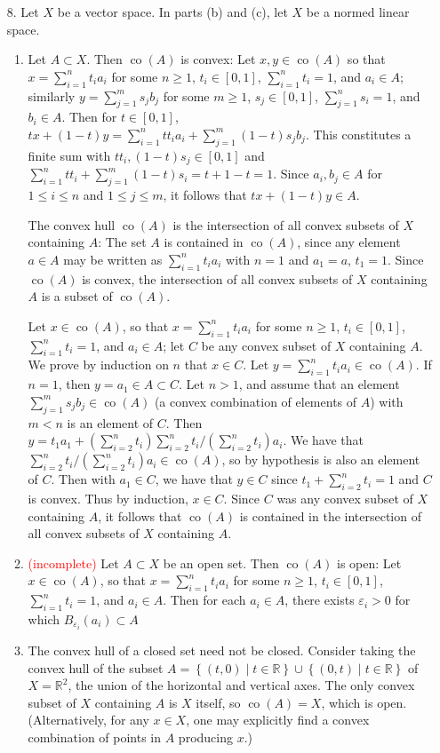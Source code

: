 \documentclass[11pt,leqno]{article}
\theoremstyle{plain}
\theoremstyle{definition}
\numberwithin{equation}{section}
\numberwithin{lem}{section}
\newcommand{\cbr}[1]{\left\{#1\right\}}
\DeclareMathOperator{\co}{co}
\begin{document}
\begin{enumerate}
  \item[8.] Let $X$ be a vector space. In parts (b) and (c), let $X$ be a normed linear space.
  \begin{enumerate}
    \item Let $A\subset X$. Then $\co(A)$ is convex: Let $x,y\in \co(A)$ so that $x = \sum_{i=1}^n t_ia_i$ for some $n\geq 1$, $t_i\in [0,1]$, $\sum_{i=1}^n t_i = 1$, and $a_i\in A$; similarly $y = \sum_{j=1}^m s_jb_j$ for some $m\geq 1$, $s_j\in [0,1]$, $\sum_{j=1}^n s_i = 1$, and $b_i\in A$. Then for $t\in [0,1]$, $tx + (1-t)y = \sum_{i=1}^n tt_ia_i + \sum_{j=1}^m (1-t)s_jb_j$. This constitutes a finite sum with $tt_i,(1-t)s_j\in [0,1]$ and $\sum_{i=1}^n tt_i + \sum_{j=1}^m (1-t)s_i = t + 1-t =1$. Since $a_i,b_j\in A$ for $1\leq i\leq n$ and $1\leq j\leq m$, it follows that $tx + (1-t)y\in A$.
    
    The convex hull $\co(A)$ is the intersection of all convex subsets of $X$ containing $A$: The set $A$ is contained in $\co(A)$, since any element $a\in A$ may be written as $\sum_{i=1}^n t_ia_i$ with $n = 1$ and $a_1 = a$, $t_1 = 1$. Since $\co(A)$ is convex, the intersection of all convex subsets of $X$ containing $A$ is a subset of $\co(A)$.
    
    Let $x\in \co(A)$, so that $x = \sum_{i=1}^n t_ia_i$ for some $n\geq 1$, $t_i\in [0,1]$, $\sum_{i=1}^n t_i = 1$, and $a_i\in A$; let $C$ be any convex subset of $X$ containing $A$. We prove by induction on $n$ that $x\in C$. Let $y = \sum_{i=1}^n t_ia_i \in \co(A)$. If $n = 1$, then $y = a_1\in A\subset C$. Let $n>1$, and assume that an element $\sum_{j=1}^ms_jb_j\in \co(A)$ (a convex combination of elements of $A$) with $m<n$ is an element of $C$. Then $y = t_1a_1 + (\sum_{i=2}^n t_i)\sum_{i=2}^{n}t_i/(\sum_{i=2}^n t_i)a_i$. We have that $\sum_{i=2}^{n}t_i/(\sum_{i=2}^n t_i)a_i\in \co(A)$, so by hypothesis is also an element of $C$. Then with $a_1\in C$, we have that $y\in C$ since $t_1 + \sum_{i=2}^n t_i = 1$ and $C$ is convex. Thus by induction, $x\in C$. Since $C$ was any convex subset of $X$ containing $A$, it follows that $\co(A)$ is contained in the intersection of all convex subsets of $X$ containing $A$.

    \item \textcolor{red}{(incomplete)} Let $A\subset X$ be an open set. Then $\co(A)$ is open: Let $x\in \co(A)$, so that $x = \sum_{i=1}^n t_ia_i$ for some $n\geq 1$, $t_i\in [0,1]$, $\sum_{i=1}^n t_i = 1$, and $a_i\in A$. Then for each $a_i\in A$, there exists $\varepsilon_i>0$ for which $B_{\varepsilon_i}(a_i)\subset A$
    
    \item The convex hull of a closed set need not be closed. Consider taking the convex hull of the subset $A = \cbr{(t,0)\mid t\in \mathbb R}\cup \cbr{(0,t)\mid t\in \mathbb R}$ of $X = \mathbb R^2$, the union of the horizontal and vertical axes. The only convex subset of $X$ containing $A$ is $X$ itself, so $\co(A) = X$, which is open. (Alternatively, for any $x\in X$, one may explicitly find a convex combination of points in $A$ producing $x$.)
  \end{enumerate}
\end{enumerate}
\end{document}

